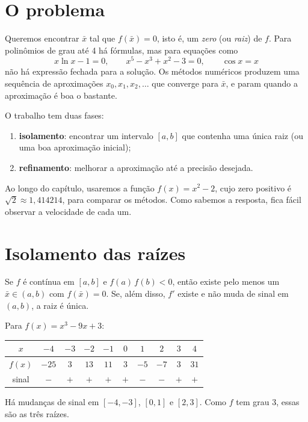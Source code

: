 \section{O problema}

Queremos encontrar $\bar x$ tal que $f(\bar x)=0$, isto é, um \emph{zero} (ou \emph{raiz}) de
$f$. Para polinômios de grau até 4 há fórmulas, mas para equações como
\[
x\ln x-1=0,\qquad x^5-x^3+x^2-3=0,\qquad \cos x=x
\]
não há expressão fechada para a solução. Os métodos numéricos produzem uma sequência de
aproximações $x_0,x_1,x_2,\dots$ que converge para $\bar x$, e param quando a aproximação é
boa o bastante.

O trabalho tem duas fases:
\begin{enumerate}[nosep]
  \item \textbf{isolamento}: encontrar um intervalo $[a,b]$ que contenha uma única raiz
        (ou uma boa aproximação inicial);
  \item \textbf{refinamento}: melhorar a aproximação até a precisão desejada.
\end{enumerate}

Ao longo do capítulo, usaremos a função $f(x)=x^2-2$, cujo zero positivo é
$\sqrt2\approx1{,}414214$, para comparar os métodos. Como sabemos a resposta, fica fácil
observar a velocidade de cada um.

\section{Isolamento das raízes}

\begin{teorema}[Bolzano]
Se $f$ é contínua em $[a,b]$ e $f(a)\,f(b)<0$, então existe pelo menos um
$\bar x\in(a,b)$ com $f(\bar x)=0$. Se, além disso, $f'$ existe e não muda de sinal em
$(a,b)$, a raiz é única.
\end{teorema}

\begin{exemplo}
Para $f(x)=x^3-9x+3$:
\begin{center}
\begin{tabular}{c|ccccccccc}
$x$ & $-4$ & $-3$ & $-2$ & $-1$ & $0$ & $1$ & $2$ & $3$ & $4$\\ \hline
$f(x)$ & $-25$ & $3$ & $13$ & $11$ & $3$ & $-5$ & $-7$ & $3$ & $31$\\
sinal & $-$ & $+$ & $+$ & $+$ & $+$ & $-$ & $-$ & $+$ & $+$
\end{tabular}
\end{center}
Há mudanças de sinal em $[-4,-3]$, $[0,1]$ e $[2,3]$. Como $f$ tem grau 3, essas são as três raízes.
\end{exemplo}


